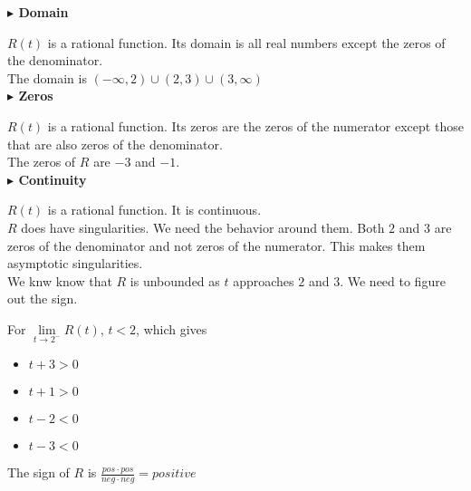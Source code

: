 \documentclass{ximera}
\begin{document}
\begin{example}
\textbf{\textcolor{blue!55!black}{$\blacktriangleright$ Domain}} 

$R(t)$ is a rational function.  Its domain is all real numbers except the zeros of the denominator. \\

The domain is $(-\infty, 2) \cup (2,3) \cup (3, \infty)$  \\














\textbf{\textcolor{blue!55!black}{$\blacktriangleright$ Zeros}} 


$R(t)$ is a rational function.  Its zeros are the zeros of the numerator except those that are also zeros of the denominator. \\


The zeros of $R$ are $-3$ and $-1$. \\






\textbf{\textcolor{blue!55!black}{$\blacktriangleright$ Continuity}} 


$R(t)$ is a rational function.  It is continuous. \\


$R$ does have singularities.  We need the behavior around them.   Both $2$ and $3$ are zeros of the denominator and not zeros of the numerator.  This makes them asymptotic singularities. \\


We knw know that $R$ is unbounded as $t$ approaches $2$ and $3$.  We need to figure out the sign. \\


\begin{explanation}


For $\lim\limits_{t \to 2^-}R(t)$,  $t < 2$, which gives

\begin{itemize}
\item $t + 3 > 0$
\item $t + 1 > 0$
\item $t - 2 < 0$
\item $t - 3 < 0$
\end{itemize}


The sign of $R$ is $\frac{pos \cdot pos}{neg \cdot neg} = positive$ \\




\end{explanation}
\end{example}
\end{document}
